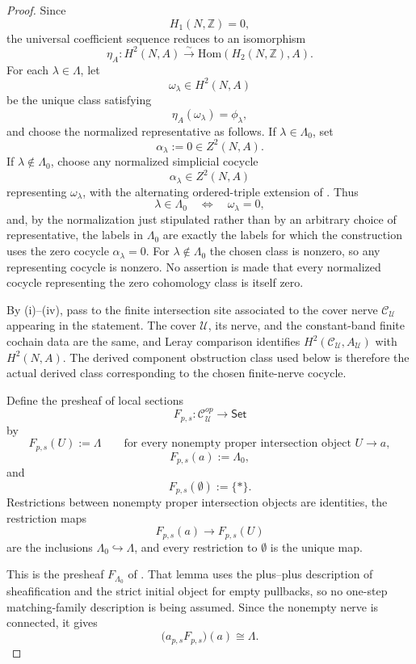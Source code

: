 \begin{proof}
Since
\[
H_1(N,\mathbb Z)=0,
\]
the universal coefficient sequence reduces to an isomorphism
\[
\eta_A:H^2(N,A)\xrightarrow{\sim}\mathrm{Hom}(H_2(N,\mathbb Z),A).
\]
For each $\lambda\in\Lambda$, let
\[
\omega_\lambda\in H^2(N,A)
\]
be the unique class satisfying
\[
\eta_A(\omega_\lambda)=\phi_\lambda,
\]
and choose the normalized representative as follows. If
\(\lambda\in\Lambda_0\), set
\[
\alpha_\lambda:=0\in Z^2(N,A).
\]
If \(\lambda\notin\Lambda_0\), choose any normalized simplicial cocycle
\[
\alpha_\lambda\in Z^2(N,A)
\]
representing \(\omega_\lambda\), with the alternating ordered-triple
extension of . Thus
\[
\lambda\in\Lambda_0
\quad\Longleftrightarrow\quad
\omega_\lambda=0,
\]
and, by the normalization just stipulated rather than by an arbitrary choice
of representative, the labels in \(\Lambda_0\) are exactly the labels for
which the construction uses the zero cocycle \(\alpha_\lambda=0\). For
\(\lambda\notin\Lambda_0\) the chosen class is nonzero, so any representing
cocycle is nonzero. No assertion is made that every normalized cocycle
representing the zero cohomology class is itself zero.

By (i)--(iv), pass to the
finite intersection site associated to the cover nerve $\mathcal C_{\mathcal U}$ appearing in the statement.
The cover $\mathcal U$, its nerve, and the constant-band finite cochain
data are the same, and Leray comparison identifies
$H^2(\mathcal C_{\mathcal U},A_{\mathcal U})$ with $H^2(N,A)$. The derived component obstruction class
used below is therefore the actual derived class corresponding to the
chosen finite-nerve cocycle.

Define the presheaf of local sections
\[
F_{p,s}:\mathcal C_{\mathcal U}^{op}\to\mathsf{Set}
\]
by
\[
F_{p,s}(U):=\Lambda
\qquad
\text{for every nonempty proper intersection object }U\to a,
\]
\[
F_{p,s}(a):=\Lambda_0,
\]
and
\[
F_{p,s}(\emptyset):=\{\ast\}.
\]
Restrictions between nonempty proper intersection objects are identities,
the restriction maps
\[
F_{p,s}(a)\to F_{p,s}(U)
\]
are the inclusions $\Lambda_0\hookrightarrow \Lambda$, and every
restriction to $\emptyset$ is the unique map.

This is the presheaf \(F_{\Lambda_0}\) of
. That lemma uses the plus--plus
description of sheafification and the strict initial object for empty
pullbacks, so no one-step matching-family description is being assumed.
Since the nonempty nerve is connected, it gives
\[
\bigl(a_{p,s}F_{p,s}\bigr)(a)\cong \Lambda.
\]


\end{proof}
